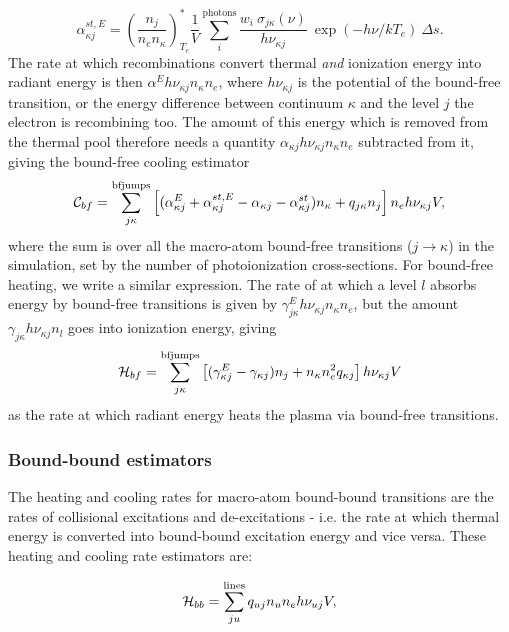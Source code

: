 \begin{equation}
\alpha_{\kappa j}^{st,E} = \left( \frac{n_j}{n_e n_\kappa} \right)^*_{T_e}
\frac{1}{V} \sum_i^{\mathrm{photons}}
\frac{w_i~\sigma_{j\kappa}({\nu})}{h \nu_{\kappa j}}
~\exp(-h\nu/kT_e)~\Delta s.
\end{equation}
The rate at which recombinations convert
thermal {\em and} ionization energy into radiant energy is then
$\alpha^E h\nu_{\kappa j} n_\kappa n_e$, where $h \nu_{\kappa j}$ is the potential of the 
bound-free transition, or the energy difference between continuum $\kappa$ and 
the level $j$ the electron is recombining too. 
The amount of this energy which is removed from the thermal pool
therefore needs a quantity $\alpha_{\kappa j} h\nu_{\kappa j} n_\kappa n_e$ subtracted from it,
giving the bound-free cooling estimator
\begin{equation}
{\cal C}_{bf} = \sum_{j\kappa}^{\mathrm{bfjumps}} 
\left[ (\alpha^E_{\kappa j} + \alpha^{st,E}_{\kappa j} - \alpha_{\kappa j} - \alpha^{st}_{\kappa j}) 
n_{\kappa} + 
q_{j\kappa} n_j \right]
n_e h\nu_{\kappa j} V,
\end{equation}
where the sum is over all the macro-atom bound-free transitions ($j\rightarrow\kappa$) 
in the simulation, set by
the number of photoionization cross-sections. 
For bound-free heating, we write a similar expression. The rate of at which
a level $l$ absorbs energy by bound-free 
transitions is given by $\gamma^E_{j\kappa} h\nu_{\kappa j} n_\kappa n_e$,
but the amount $\gamma_{j\kappa} h \nu_{\kappa j} n_l$ goes into ionization energy, giving 
\begin{equation}
{\cal H}_{bf} = \sum_{j\kappa}^{\mathrm{bfjumps}} \left[ (\gamma^E_{\kappa j} - \gamma_{\kappa j}) n_j + n_\kappa n_e^2 q_{\kappa j} \right] h \nu_{\kappa j} V
\end{equation}
as the rate at which radiant energy heats the plasma via bound-free transitions.

\subsubsection{Bound-bound estimators}
The heating and cooling rates for macro-atom bound-bound transitions are the rates of
collisional excitations and de-excitations
- i.e. the rate at which thermal energy is converted into
bound-bound excitation energy and vice versa.
These heating and cooling rate estimators are:

\begin{equation}
{\cal H}_{bb} = \sum_{ju}^{\mathrm{lines}} q_{uj} n_u n_e h \nu_{uj} V,
\end{equation}


